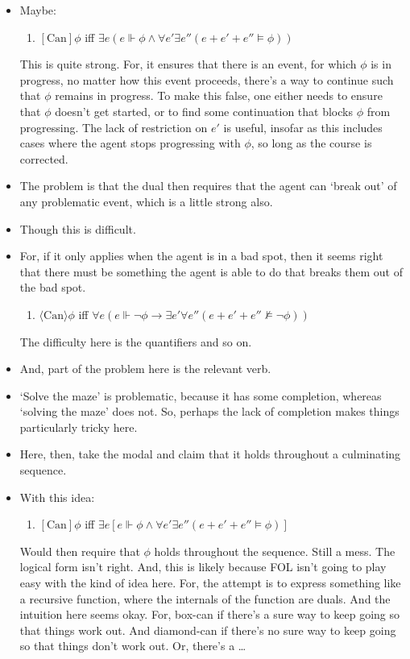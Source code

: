 \documentclass[10pt]{article}
\begin{document}
\begin{itemize}
\item Maybe:
  \begin{enumerate}
  \item \([\text{Can}]\phi\) iff \(\exists e(e \Vdash \phi \land \forall e'\exists e''(e + e' + e'' \vDash \phi))\)
  \end{enumerate}
  This is quite strong.
  For, it ensures that there is an event, for which \(\phi\) is in progress, no matter how this event proceeds, there's a way to continue such that \(\phi\) remains in progress.
  To make this false, one either needs to ensure that \(\phi\) doesn't get started, or to find some continuation that blocks \(\phi\) from progressing.
  The lack of restriction on \(e'\) is useful, insofar as this includes cases where the agent stops progressing with \(\phi\), so long as the course is corrected.
\item The problem is that the dual then requires that the agent can `break out' of any problematic event, which is a little strong also.
\item Though this is difficult.
\item For, if it only applies when the agent is in a bad spot, then it seems right that there must be something the agent is able to do that breaks them out of the bad spot.
  \begin{enumerate}
  \item \(\langle \text{Can} \rangle \phi\) iff \(\forall e(e \Vdash \lnot\phi \rightarrow \exists e'\forall e''(e + e' + e'' \nvDash \lnot\phi))\)
  \end{enumerate}
  The difficulty here is the quantifiers and so on.
\item And, part of the problem here is the relevant verb.
\item `Solve the maze' is problematic, because it has some completion, whereas `solving the maze' does not.
  So, perhaps the lack of completion makes things particularly tricky here.
\item Here, then, take the modal and claim that it holds throughout a culminating sequence.
\item With this idea:
  \begin{enumerate}
  \item \([\text{Can}]\phi\) iff \(\exists e[e \Vdash \phi \land \forall e'\exists e''(e + e' + e'' \vDash \phi)]\)
  \end{enumerate}
  Would then require that \(\phi\) holds throughout the sequence.
  Still a mess.
  The logical form isn't right.
  And, this is likely because FOL isn't going to play easy with the kind of idea here.
  For, the attempt is to express something like a recursive function, where the internals of the function are duals.
  And the intuition here seems okay.
  For, box-can if there's a sure way to keep going so that things work out.
  And diamond-can if there's no sure way to keep going so that things don't work out.
  Or, there's a \dots
\end{itemize}
\end{document}
